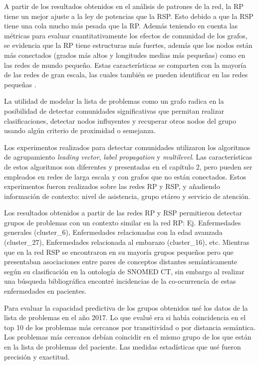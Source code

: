 A partir de los resultados obtenidos en el análisis de patrones de la red, la RP tiene un mejor ajuste a la ley de potencias que la RSP. Esto debido a que la RSP tiene una cola mucho más pesada que la RP. Además teniendo en cuenta las métricas para evaluar cuantitativamente los efectos de comunidad de los grafos, se evidencia que la RP tiene estructuras más fuertes, además que los nodos están más conectados (grados más altos y longitudes medias más pequeñas) como en las redes de mundo pequeño\cite{Cook2006}. Estas características se comparten con la mayoría de las redes de gran escala, las cuales también se pueden identificar en las redes pequeñas \cite{Tang2010}.

La utilidad de modelar la lista de problemas como un grafo radica en la posibilidad de detectar comunidades significativas que permitan realizar clasificaciones, detectar nodos influyentes y recuperar otros nodos del grupo usando algún criterio de proximidad o semejanza.

Los experimentos realizados para detectar comunidades utilizaron los  algoritmos de agrupamiento \textit{leading vector}, \textit{label propagation} y \textit{multilevel}. Las características de estos algoritmos son diferentes y presentadas en el capítulo 2, pero pueden ser empleados en redes de larga escala y con grafos que no están conectados. Estos experimentos fueron realizados sobre las redes RP y RSP, y añadiendo información de contexto: nivel de asistencia, grupo etáreo y servicio de atención.

Los resultados obtenidos a partir de las redes RP y RSP  permitieron detectar grupos de problemas con un contexto similar en la red RP: Ej. Enfermedades generales (cluster\_6), Enfermedades relacionadas con la edad avanzada (cluster\_27), Enfermedades relacionada al embarazo (cluster\_16), etc. Mientras que en la red RSP se encontraron en su mayoría grupos pequeños pero que presentaban asociaciones entre pares de conceptos distantes semánticamente según su clasificación en la ontología de SNOMED CT, sin embargo al realizar una búsqueda bibliográfica encontré incidencias de la co-ocurrencia de estas enfermedades en pacientes.

Para evaluar la capacidad predictiva de los grupos obtenidos usé los datos de la lista de problemas en el año 2017. Lo que evalué era si había coincidencia en el top 10 de los problemas más cercanos por transitividad o por distancia semántica. Los problemas más cercanos debían coincidir en el mismo grupo de los que están en la lista de problemas del paciente. Las medidas estadísticas que usé fueron precisión y exactitud.

